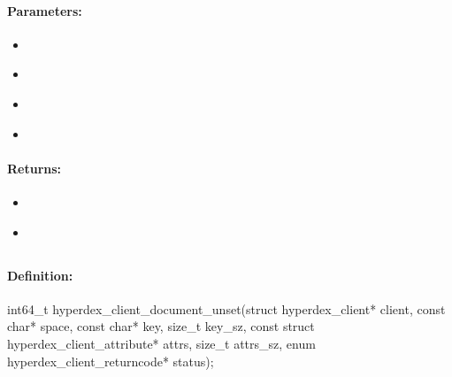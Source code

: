\paragraph{Parameters:}
\begin{itemize}[noitemsep]
\item {}\\

\item {}\\

\item {}\\

\item {}\\

\end{itemize}

\paragraph{Returns:}
\begin{itemize}[noitemsep]
\item {}\\

\item {}\\

\end{itemize}

\pagebreak
\subsection{}
\label{api:c:document_unset}


\paragraph{Definition:}
\begin{ccode}
int64_t hyperdex_client_document_unset(struct hyperdex_client* client,
        const char* space,
        const char* key, size_t key_sz,
        const struct hyperdex_client_attribute* attrs, size_t attrs_sz,
        enum hyperdex_client_returncode* status);
\end{ccode}

